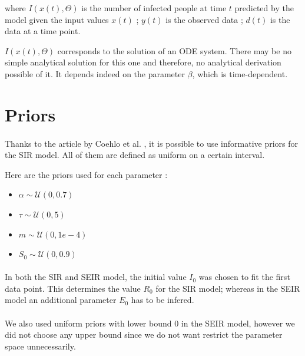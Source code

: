 \documentclass[11pt, a4paper]{article}
\begin{document}
where $I(x(t), \Theta)$ is the number of infected people at time $t$ predicted by the model given the input values $x(t)$ ; $y(t)$ is the observed data ; $d(t)$ is the data at a time point.

$I(x(t), \Theta)$ corresponds to the solution of an ODE system. There may be no simple analytical solution for this one and therefore, no analytical derivation possible of it. It depends indeed on the parameter $\beta$, which is time-dependent.

\section{Priors}
\paragraph{}
Thanks to the article by Coehlo et al. \cite{coelho2011bayesian}, it is possible to use informative priors for the SIR model. All of them are defined as uniform on a certain interval.

Here are the priors used for each parameter : 
\begin{itemize}
\item $\alpha \sim \mathcal{U}(0, 0.7)$
\item $\tau \sim \mathcal{U}(0, 5)$
\item $m \sim  \mathcal{U}(0, 1e-4)$
\item $S_0 \sim \mathcal{U}(0, 0.9)$
\end{itemize}

\paragraph{}
In both the SIR and SEIR model, the initial value $I_0$ was chosen to fit the first data point. This determines the value $R_0$ for the SIR model; whereas in the SEIR model an additional parameter $E_0$ has to be infered.

\paragraph{}
We also used uniform priors with lower bound 0 in the SEIR model, however we did not choose any upper bound since we do not want restrict the parameter space unnecessarily.
\end{document}
